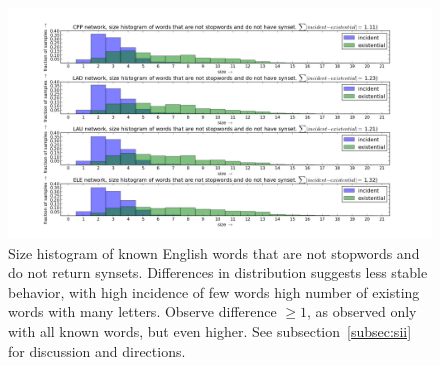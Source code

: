 \documentclass[%
 aip,
 jmp,%
 amsmath,amssymb,
 reprint,%
 floatfix,
]{revtex4-1}
\begin{document}
\begin{figure}[h!]
    \centering
    \includegraphics[width=\textwidth]{figs/nssnsw}
    \caption{Size histogram of known English words that are not stopwords and do not return synsets. Differences in distribution suggests less stable behavior, with high incidence of few words high number of existing words with many letters. Observe difference $\geq 1$, as observed only with all known words, but even higher. See subsection~\ref{subsec:sii} for discussion and directions.}
    \label{fig:nssnsw}
\end{figure}





\clearpage
\end{document}
